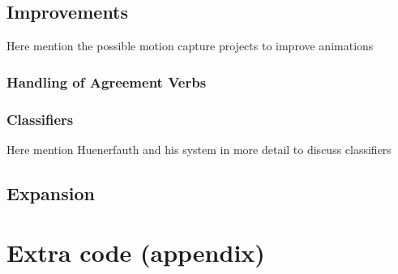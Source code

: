 \documentclass[12pt]{ociamthesis}  %
\begin{document}
\section{Improvements}
	Here mention the possible motion capture projects to improve animations
	\subsection{Handling of Agreement Verbs}
	\subsection{Classifiers}
	Here mention Huenerfauth and his system in more detail to discuss classifiers 
\section{Expansion}


{\pagestyle{plain}
\appendix
\chapter{Extra code (appendix)}

\newpage

\makeatletter
\renewcommand\@biblabel[1]{}
\makeatother
{}
\cleardoublepage}
\end{document}
